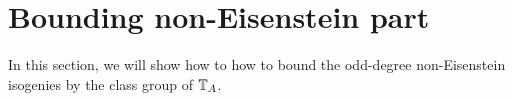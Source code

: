 \documentclass[thesis.tex]{subfiles}
\begin{document}



\section{Bounding non-Eisenstein part}%
\label{sec:non_eisenstein_part}

In this section, we will show how to how to bound the odd-degree non-Eisenstein
isogenies by the class group of $\mathbb{T}_A$.
\end{document}

